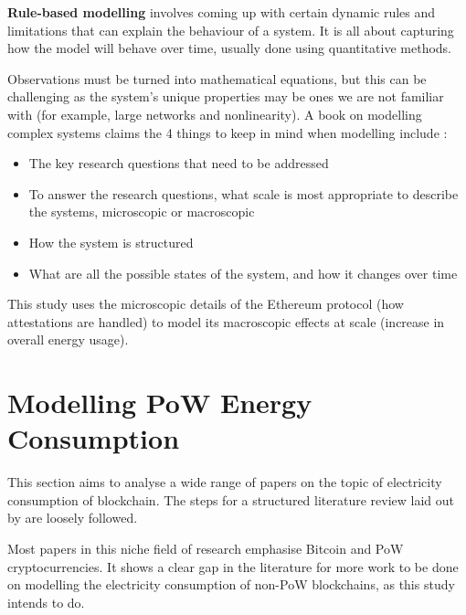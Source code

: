 \textbf{Rule-based modelling} involves coming up with certain dynamic rules and limitations that can explain the behaviour of a system. It is all about capturing how the model will behave over time, usually done using quantitative methods.

Observations must be turned into mathematical equations, but this can be challenging as the system's unique properties may be ones we are not familiar with (for example, large networks and nonlinearity). A book on modelling complex systems claims the 4 things to keep in mind when modelling include \cite{SayamaINTRODUCTIONSYSTEMS}:

\begin{itemize}
    \item The key research questions that need to be addressed
    \item To answer the research questions, what scale is most appropriate to describe the systems, microscopic or macroscopic
    \item How the system is structured
    \item What are all the possible states of the system, and how it changes over time
\end{itemize}

This study uses the microscopic details of the Ethereum protocol (how attestations are handled) to model its macroscopic effects at scale (increase in overall energy usage). 







\section{Modelling PoW Energy Consumption}

This section aims to analyse a wide range of papers on the topic of electricity consumption of blockchain. The steps for a structured literature review laid out by \cite{Crosby2015BlockChainBitcoin} are loosely followed. 

Most papers in this niche field of research emphasise Bitcoin and PoW cryptocurrencies. It shows a clear gap in the literature for more work to be done on modelling the electricity consumption of non-PoW blockchains, as this study intends to do.


